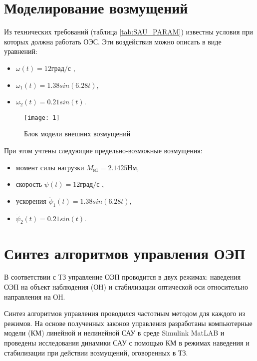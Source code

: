 \section{Моделирование возмущений} \label{ch:ch4/sect2+1}

Из технических требований (таблица \ref{tab:SAU_PARAM}) известны условия при которых должна работать ОЭС. Эти воздействия можно описать в виде уравнений:
\begin{itemize}
	\item \( \omega  \left( t \right) = 12 \textit{град/с} \) ,
	\item \(  \omega _{1} ( t ) =1.38sin \left( 6.28 t \right) \),
	\item \( \omega_2 (t) = 0.21 sin(t) \).
\end{itemize}

\begin{figure}[ht]
	\centering
	\texttt{[image: 1]} 
	\caption{Блок модели внешних возмущений}
	\label{fig:la_model}
\end{figure}

При этом учтены следующие предельно-возможные возмущения: 
\begin{itemize}
	\item момент силы нагрузки $M_{\textit{н1}} = 2.1425 \textit{Нм}$,
	\item скорость \( \dot \psi  \left( t \right) = 12 \textit{град/с} \) ,
	\item ускорения \(  \ddot \psi _{1} \left( t \right) =1.38sin \left( 6.28 t \right) \),
	\item \( \ddot \psi_2 (t) = 0.21 sin(t) \).
\end{itemize}

\section{Синтез алгоритмов управления ОЭП} \label{ch:ch4/sect4-}

В соответствии с ТЗ управление ОЭП проводится в двух режимах:
наведения ОЭП на объект наблюдения (ОН) и стабилизации оптической оси относительно направления на ОН. 

Синтез алгоритмов управления проводился частотным методом \cite[]{Bessekerski} для каждого из режимов. На основе полученных законов управления разработаны компьютерные модели (КМ) линейной и нелинейной САУ в среде Simulink MatLAB и проведены исследования динамики САУ с помощью КМ в режимах наведения и стабилизации при действии возмущений, оговоренных в ТЗ.

